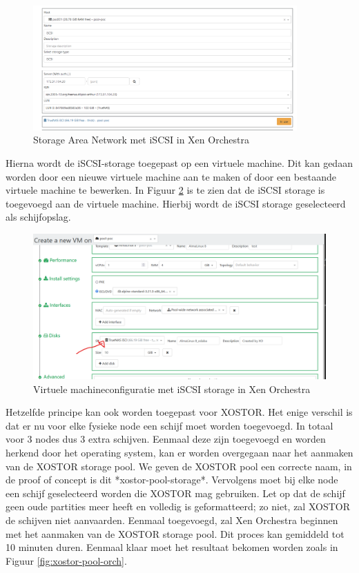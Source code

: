 \begin{figure}[H]
  \centering
  \includegraphics[width=0.9\textwidth, trim=0cm 0cm 20cm 0cm, clip]{../poc/iSCI-orch.png}
  \caption{Storage Area Network met iSCSI in Xen Orchestra}
  \label{fig:iscsi-orch}
\end{figure}  
Hierna wordt de iSCSI-storage toegepast op een virtuele machine. Dit kan gedaan worden door een nieuwe virtuele machine aan te maken of door een bestaande virtuele machine te bewerken.  
In Figuur \ref{fig:vm-storage-orch} is te zien dat de iSCSI storage is toegevoegd aan de virtuele machine. Hierbij wordt de iSCSI storage geselecteerd als schijfopslag.

\begin{figure}[H]
  \centering
  \includegraphics[width=1.0\textwidth, trim=0cm 0cm 15cm 0cm, clip]{../poc/isci-vm-orch.png}
  \caption{Virtuele machineconfiguratie met iSCSI storage in Xen Orchestra}
  \label{fig:vm-storage-orch}
\end{figure}

Hetzelfde principe kan ook worden toegepast voor XOSTOR. Het enige verschil is dat er nu voor elke fysieke node een schijf moet worden toegevoegd. In totaal voor 3 nodes dus 3 extra schijven.  
Eenmaal deze zijn toegevoegd en worden herkend door het operating system, kan er worden overgegaan naar het aanmaken van de XOSTOR storage pool.  
We geven de XOSTOR pool een correcte naam, in de proof of concept is dit *xostor-pool-storage*. Vervolgens moet bij elke node een schijf geselecteerd worden die XOSTOR mag gebruiken.
Let op dat de schijf geen oude partities meer heeft en volledig is geformatteerd; zo niet, zal XOSTOR de schijven niet aanvaarden. Eenmaal toegevoegd, zal Xen Orchestra beginnen met het aanmaken van de XOSTOR storage pool.  
Dit proces kan gemiddeld tot 10 minuten duren. Eenmaal klaar moet het resultaat bekomen worden zoals in Figuur \ref{fig:xostor-pool-orch}.

